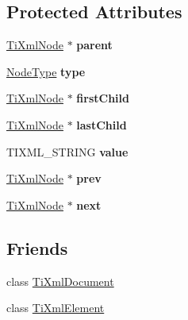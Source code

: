 \subsection*{Protected Attributes}
\begin{DoxyCompactItemize}
\item 
\hypertarget{class_ti_xml_node_a662c4de61244e4fa5bd4e2d8c63143a5}{
\hyperlink{class_ti_xml_node}{TiXmlNode} $\ast$ {\bfseries parent}}
\label{class_ti_xml_node_a662c4de61244e4fa5bd4e2d8c63143a5}

\item 
\hypertarget{class_ti_xml_node_a2619c6379181c16ba95ae6922e2ca839}{
\hyperlink{class_ti_xml_node_a836eded4920ab9e9ef28496f48cd95a2}{NodeType} {\bfseries type}}
\label{class_ti_xml_node_a2619c6379181c16ba95ae6922e2ca839}

\item 
\hypertarget{class_ti_xml_node_af749fb7f22010b80e8f904c32653d50e}{
\hyperlink{class_ti_xml_node}{TiXmlNode} $\ast$ {\bfseries firstChild}}
\label{class_ti_xml_node_af749fb7f22010b80e8f904c32653d50e}

\item 
\hypertarget{class_ti_xml_node_a5b30756d21b304580d22a841ec9d61f8}{
\hyperlink{class_ti_xml_node}{TiXmlNode} $\ast$ {\bfseries lastChild}}
\label{class_ti_xml_node_a5b30756d21b304580d22a841ec9d61f8}

\item 
\hypertarget{class_ti_xml_node_aead528b3cedc33c16a6c539872c7cc8b}{
TIXML\_\-STRING {\bfseries value}}
\label{class_ti_xml_node_aead528b3cedc33c16a6c539872c7cc8b}

\item 
\hypertarget{class_ti_xml_node_a9c5370ea2cbfd9f0e0f7b30a57fd68f5}{
\hyperlink{class_ti_xml_node}{TiXmlNode} $\ast$ {\bfseries prev}}
\label{class_ti_xml_node_a9c5370ea2cbfd9f0e0f7b30a57fd68f5}

\item 
\hypertarget{class_ti_xml_node_a2f329cc993d2d34df76e17dcbb776b45}{
\hyperlink{class_ti_xml_node}{TiXmlNode} $\ast$ {\bfseries next}}
\label{class_ti_xml_node_a2f329cc993d2d34df76e17dcbb776b45}

\end{DoxyCompactItemize}
\subsection*{Friends}
\begin{DoxyCompactItemize}
\item 
\hypertarget{class_ti_xml_node_a173617f6dfe902cf484ce5552b950475}{
class \hyperlink{class_ti_xml_node_a173617f6dfe902cf484ce5552b950475}{TiXmlDocument}}
\label{class_ti_xml_node_a173617f6dfe902cf484ce5552b950475}

\item 
\hypertarget{class_ti_xml_node_ab6592e32cb9132be517cc12a70564c4b}{
class \hyperlink{class_ti_xml_node_ab6592e32cb9132be517cc12a70564c4b}{TiXmlElement}}
\label{class_ti_xml_node_ab6592e32cb9132be517cc12a70564c4b}

\end{DoxyCompactItemize}



